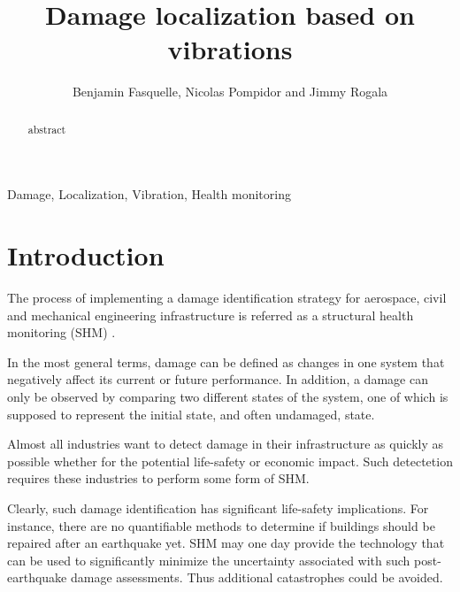 \documentclass[journal]{IEEEtran}
\begin{document}
%
\title{Damage localization based on vibrations}


\author{Benjamin Fasquelle, Nicolas Pompidor and Jimmy Rogala}

\newtheorem{remark}{Remark}



\maketitle


\begin{abstract}
abstract
\end{abstract}

\begin{IEEEkeywords}
Damage, Localization, Vibration, Health monitoring
\end{IEEEkeywords}


\IEEEpeerreviewmaketitle



\section{Introduction}


The process of implementing a damage identification strategy for aerospace,
 civil and mechanical engineering infrastructure is referred as a structural health monitoring (SHM) \cite{farrar2007introduction}.

In the most general terms, damage can be defined as changes in one system that negatively affect its current or future performance. 
In addition, a damage can only be observed by comparing two different states of the system,
 one of which is supposed to represent the initial state, and often undamaged, state.


Almost all industries want to detect damage in their infrastructure as quickly as possible whether 
 for the potential life-safety or economic impact.
Such detectetion requires these industries to perform some form of SHM.


Clearly, such damage identification has significant life-safety implications.
For instance, there are  no quantifiable methods to
 determine if buildings should be repaired after an earthquake yet.
SHM may one day provide the technology that can be used to significantly minimize
 the uncertainty associated with such post-earthquake damage assessments.
Thus additional catastrophes could be avoided.
\end{document}
